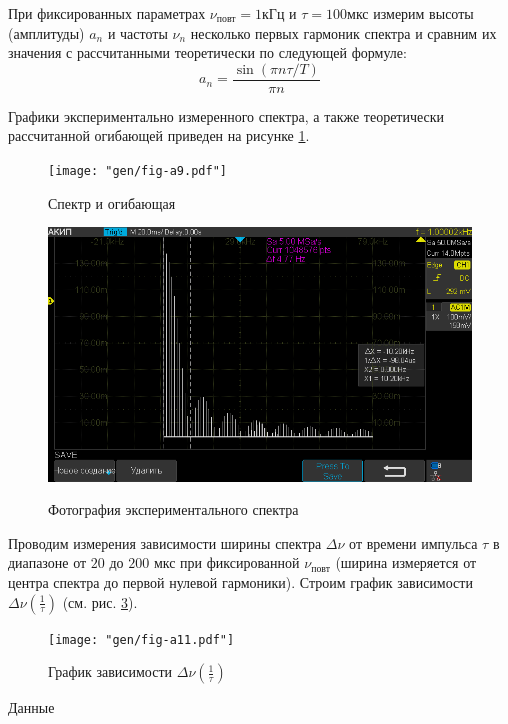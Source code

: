 \documentclass[12pt,a4paper]{article}
\begin{document}
При фиксированных параметрах $\nu_{\text{повт}} = 1 \text{кГц}$ и $\tau = 100 \text{мкс}$ измерим высоты (амплитуды) $a_n$ и частоты $\nu_n$ несколько первых гармоник спектра и сравним их значения с рассчитанными теоретически по следующей формуле:
$$a_n = \frac{\sin{(\pi n \tau/T)}}{\pi n}$$

Графики экспериментально измеренного спектра, а также теоретически рассчитанной огибающей приведен на рисунке \ref{fig:a9}.

\noindent \begin{minipage}[B]{.5\textwidth}
\begin{figure}[H]
	\centering
	\texttt{[image: "gen/fig-a9.pdf"]}
	\label{fig:a9}
	\caption{Спектр и огибающая}
\end{figure}
\end{minipage}%
\begin{minipage}[B]{.5\textwidth}
\begin{figure}[H]
	\centering
	\includegraphics[width=0.7\linewidth]{"photo/impulse5"}
	\label{photo:impulse_tau}
	\caption{Фотография экспериментального спектра}
\end{figure}
\end{minipage}

Проводим измерения зависимости ширины спектра $\Delta\nu$ от времени
импульса $\tau$ в диапазоне от $20$ до $200$ мкс при фиксированной $\nu_{\text{повт}}$ (ширина
измеряется от центра спектра до первой нулевой гармоники). Строим график зависимости $\Delta\nu(\frac{1}{\tau})$ (см. рис. \ref{fig:a11}).

\noindent \begin{minipage}[B]{.5\textwidth}
	\begin{figure}[H]
		\centering
		\texttt{[image: "gen/fig-a11.pdf"]}
		\label{fig:a11}
		\caption{График зависимости $\Delta\nu(\frac{1}{\tau})$ }
	\end{figure}
\end{minipage}%
\begin{minipage}[B]{.5\textwidth}
	\begin{table}[H]
		\footnotesize
		
		\caption{Данные}
		\label{tab:a11}
	\end{table}
\end{minipage}
\end{document}

